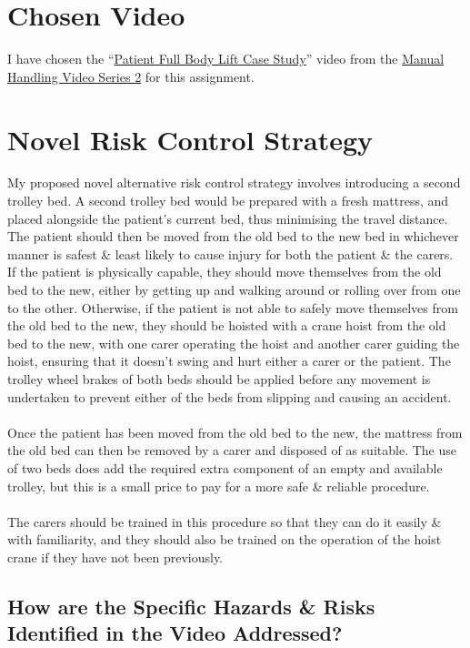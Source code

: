 \documentclass[a4paper]{article}
\begin{document}
\begin{multicols}{2}
\section{Chosen Video}
I have chosen the ``\href{https://www.youtube.com/watch?v=RF6PrPhyoXs}{Patient Full Body Lift Case Study}''
video from the
\href{https://www.hsa.ie/eng/Workplace_Health/Manual_Handling_Display_Screen_Equipment/Risk_Assessment_Videos/Manual_Handling_Videos_Series_2/}{Manual Handling Video Series 2} for this assignment.

\section{Novel Risk Control Strategy}
My proposed novel alternative risk control strategy involves introducing a second trolley bed.
A second trolley bed would be prepared with a fresh mattress, and placed alongside the patient's current bed, thus
minimising the travel distance.
The patient should then be moved from the old bed to the new bed in whichever manner is safest \& least likely to cause
injury for both the patient \& the carers.
If the patient is physically capable, they should move themselves from the old bed to the new, either by getting up and
walking around or rolling over from one to the other.
Otherwise, if the patient is not able to safely move themselves from the old bed to the new, they should be hoisted
with a crane hoist from the old bed to the new, with one carer operating the hoist and another carer guiding the hoist,
ensuring that it doesn't swing and hurt either a carer or the patient.
The trolley wheel brakes of both beds should be applied before any movement is undertaken to prevent either of the beds
from slipping and causing an accident.
\\\\
Once the patient has been moved from the old bed to the new, the mattress from the old bed can then be removed by a
carer and disposed of as suitable.
The use of two beds does add the required extra component of an empty and available trolley, but this is a small price
to pay for a more safe \& reliable procedure.
\\\\
The carers should be trained in this procedure so that they can do it easily \& with familiarity, and they should also
be trained on the operation of the hoist crane if they have not been previously.

\subsection{How are the Specific Hazards \& Risks Identified in the Video Addressed?}

\end{multicols}
\end{document}
